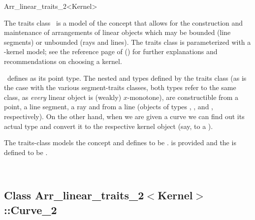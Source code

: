 
\ccRefPageBegin

\begin{ccRefClass}{Arr_linear_traits_2<Kernel>}
    
\ccDefinition 

The traits class \ccRefName\ is a model of the 
concept that allows for the construction and maintenance of arrangements of
linear objects which may be bounded (line segments) or unbounded (rays
and lines). The traits class is parameterized with a \cgal-kernel model;
see the reference page of 
() for further explanations
and recommendations on choosing a kernel.

\ccRefName\ defines  as its point type. The nested
 and  types defined by the traits class
(as is the case with the various segment-traits classes, both types
refer to the same class, as {\sl every} linear object is (weakly) $x$-monotone),
are constructible from a point, a line segment, a ray and from a line
(objects of types , ,
 and , respectively). On the other
hand, when we are given a curve we can find out its actual type and convert
it to the respective kernel object (say, to a ).

The traits-class models the  concept
and defines  to
be .
 is provided and the 
is defined to be .

 
\ccIsModel
     \\

\subsection*{Class 
        Arr\_linear\_traits\_2$<$Kernel$>$::Curve\_2}


\end{ccRefClass}
